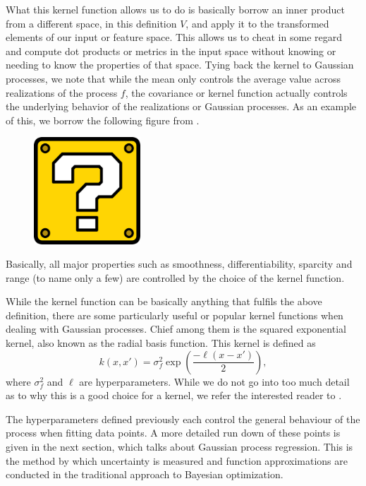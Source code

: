 What this kernel function allows us to do is basically borrow an inner product from a different space, in this definition $V$, and apply it to the transformed elements of our input or feature space. This allows us to cheat in some regard and compute dot products or metrics in the input space without knowing or needing to know the properties of that space. Tying back the kernel to Gaussian processes, we note that while the mean only controls the average value across realizations of the process $f$, the covariance or kernel function actually controls the underlying behavior of the realizations or Gaussian processes. As an example of this, we borrow the following figure from \cite{ghahramani2011tutorial}. 

\begin{figure}[h]
	\includegraphics[width=4cm]{Figures/missing.png}
	\centering
	\label{trajectories}
\end{figure}

Basically, all major properties such as smoothness, differentiability, sparcity and range (to name only a few) are controlled by the choice of the kernel function. 

While the kernel function can be basically anything that fulfils the above definition, there are some particularly useful or popular kernel functions when dealing with Gaussian processes. Chief among them is the squared exponential kernel, also known as the radial basis function. This kernel is defined as
\[ k(x, x') = \sigma_f^2 \exp \left( \frac{- \ell (x - x')}{2} \right), \]
where $\sigma_f^2$ and $\ell$ are hyperparameters. While we do not go into too much detail as to why this is a good choice for a kernel, we refer the interested reader to \cite[\S 2.1]{garnett_bayesoptbook_2023}. 

The hyperparameters defined previously each control the general behaviour of the process when fitting data points. A more detailed run down of these points is given in the next section, which talks about Gaussian process regression. This is the method by which uncertainty is measured and function approximations are conducted in the traditional approach to Bayesian optimization. 

